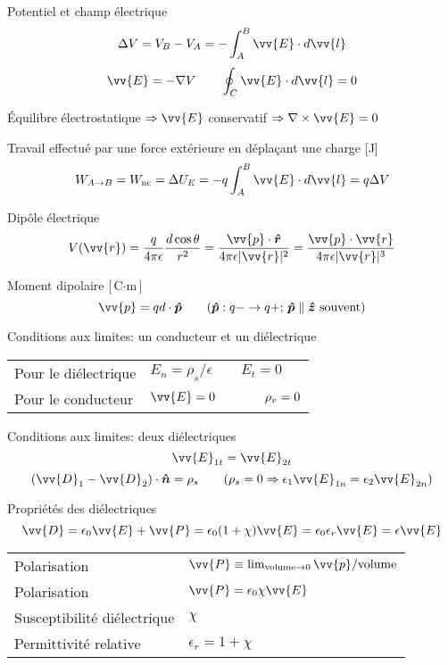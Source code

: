 \documentclass[10pt,landscape]{article}
\newcommand{\extraline}{\vspace{1em}}
\newcommand{\halfline}{\vspace{0.5em}}
\newcommand{\tableindent}{\hspace{1.5em}}
\newcommand{\uvec}[1]{\ensuremath{\boldsymbol{\hat{#1}}}}
\begin{document}
\begin{multicols}{3}
Potentiel et champ électrique
\[ \Delta V = V_B - V_A  = -\int_A^B \vv{E}\cdot d\vv{l} \]
\[ \vv{E} = -\nabla V 
 \qquad \oint_C \vv{E}\cdot d\vv{l}  = 0 \]

Équilibre électrostatique $\Rightarrow \vv{E}$ conservatif  $\Rightarrow \nabla \times \vv{E} = 0$

\extraline
Travail effectué par une force extérieure en déplaçant une charge [\si{\joule}]
\[ W_{A\rightarrow B} = W_\text{nc} = \Delta U_E = -q\int_{A}^{B} \vv{E}\cdot d\vv{l} = q\Delta V \]

Dipôle électrique
\[ V(\vv{r}) = \frac{q}{4\pi\epsilon} \frac{d\cos\theta}{r^2} =
\frac{\vv{p}\cdot\uvec{r}}{4\pi\epsilon|\vv{r}|^2} =
\frac{\vv{p}\cdot\vv{r}}{4\pi\epsilon|\vv{r}|^3} \]

Moment dipolaire [$\si{\coulomb\cdot\meter}$]
\[ \vv{p} = qd\cdot \uvec{p} \qquad \text{($\uvec{p}: q- \rightarrow q+$;  $\uvec{p}\parallel\uvec{z}$ souvent)} \]

\halfline
Conditions aux limites: un conducteur et un diélectrique  \\
\halfline
\begin{tabular}{@{\tableindent}ll@{}}
	Pour le diélectrique & $ E_n = {\rho_s}/{\epsilon} \qquad E_t = 0 $ \\
	Pour le conducteur  & $\vv{E} = 0 \qquad\qquad \rho_v = 0 $ \\
\end{tabular}

\extraline
Conditions aux limites: deux diélectriques
\[ \vv{E}_{1t} =\vv{ E}_{2t}  \]
\[ (\vv{D}_1 - \vv{D}_2) \cdot \uvec{n} = \rho_s  \qquad (\rho_s=0 \Rightarrow \epsilon_1 \vv{E}_{1n} = \epsilon_2 \vv{E}_{2n}) \] 

\halfline
Propriétés des diélectriques
\[ \vv{D} = \epsilon_0\vv{E} + \vv{P} = \epsilon_0(1+\chi)\vv{E} = \epsilon_0\epsilon_r\vv{E} = \epsilon\vv{E}  \]
\begin{tabular}{@{\tableindent}ll@{}}
	Polarisation  & $\vv{P} \equiv \lim_{\text{volume}\rightarrow 0} \vv{p}/\text{volume}$ \\
	Polarisation  & $\vv{P} = \epsilon_0\chi\vv{E}$ \\
	Susceptibilité diélectrique  & $\chi$ \\
	Permittivité relative &  $\epsilon_r=1+\chi$
\end{tabular}


\end{multicols}
\end{document}
